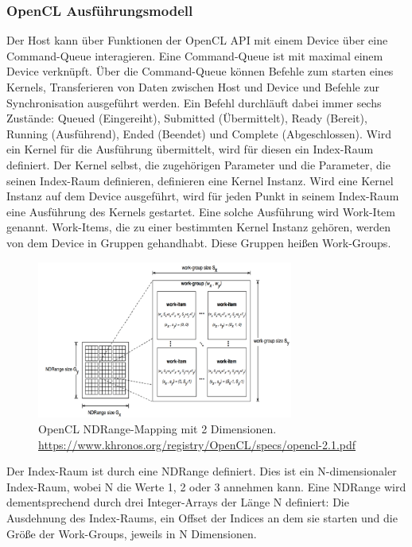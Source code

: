 \subsubsection*{OpenCL Ausführungsmodell}
Der Host kann über Funktionen der OpenCL API mit einem Device über eine Command-Queue interagieren.
Eine Command-Queue ist mit maximal einem Device verknüpft.
Über die Command-Queue können Befehle zum starten eines Kernels, Transferieren von Daten zwischen Host und Device und Befehle zur Synchronisation ausgeführt werden.
Ein Befehl durchläuft dabei immer sechs Zustände: Queued (Eingereiht), Submitted (Übermittelt), Ready (Bereit), Running (Ausführend), Ended (Beendet) und Complete (Abgeschlossen).
Wird ein Kernel für die Ausführung übermittelt, wird für diesen ein Index-Raum definiert.
Der Kernel selbst, die zugehörigen Parameter und die Parameter, die seinen Index-Raum definieren, definieren eine Kernel Instanz.
Wird eine Kernel Instanz auf dem Device ausgeführt, wird für jeden Punkt in seinem Index-Raum eine Ausführung des Kernels gestartet.
Eine solche Ausführung wird Work-Item genannt.
Work-Items, die zu einer bestimmten Kernel Instanz gehören, werden von dem Device in Gruppen gehandhabt.
Diese Gruppen heißen Work-Groups.

\begin{figure}
	\centering
	\includegraphics[width=0.75\textwidth]{../../Grafiken/OpenCL-NDRange-Mapping.png}
	\caption{OpenCL NDRange-Mapping mit 2 Dimensionen. \url{https://www.khronos.org/registry/OpenCL/specs/opencl-2.1.pdf}}
	\label{fig::ga03}
\end{figure} 
Der Index-Raum ist durch eine NDRange definiert.
Dies ist ein N-dimensionaler Index-Raum, wobei N die Werte 1, 2 oder 3 annehmen kann.
Eine NDRange wird dementsprechend durch drei Integer-Arrays der Länge N definiert: Die Ausdehnung des Index-Raums, ein Offset der Indices an dem sie starten und die Größe der Work-Groups, jeweils in N Dimensionen.

